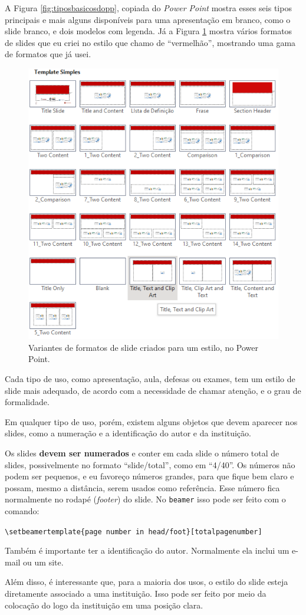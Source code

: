 A Figura \ref{fig:tiposbasicosdopp}, copiada do \textit{Power Point} mostra esses seis tipos principais e mais alguns disponíveis para uma apresentação em branco, como o slide branco, e dois modelos com legenda. Já a Figura \ref{fig:vermelhao} mostra vários formatos de slides que eu criei no estilo que chamo de ``vermelhão'', mostrando uma gama de formatos que já usei.

\begin{figure}[hbt]
    \centering
    \includegraphics[width=0.5\linewidth]{imagens/vermelhao}
    \caption{Variantes de formatos de slide criados para um estilo, no Power Point.}
    \label{fig:vermelhao}
\end{figure}


Cada tipo de uso, como apresentação, aula, defesas ou exames, tem um estilo de slide mais adequado, de acordo com a necessidade de chamar atenção, e o grau de formalidade.

Em qualquer tipo de uso, porém, existem alguns objetos que devem aparecer nos slides, como a numeração e a identificação do autor e da instituição.

Os slides \textbf{devem ser numerados} e conter em cada slide o número total de slides, possivelmente no formato ``slide/total'', como em ``4/40''. Os números não podem ser pequenos, e eu favoreço números grandes, para que fique bem claro e possam, mesmo a distância, serem usados como referência. Esse número fica normalmente no rodapé (\textit{footer}) do slide. No \texttt{beamer} isso pode ser feito com o comando:

\verb|\setbeamertemplate{page number in head/foot}[totalpagenumber]|


Também é importante ter a identificação do autor. Normalmente ela inclui um e-mail ou um site.

Além disso, é interessante que, para a maioria dos usos, o estilo do slide esteja diretamente associado a uma instituição. Isso pode ser feito por meio da colocação do logo da instituição em uma posição clara.

